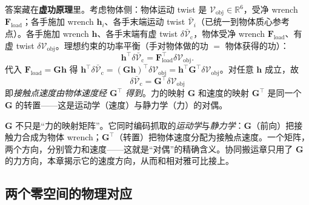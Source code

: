答案藏在\textbf{虚功原理}里。考虑物体侧：物体运动 twist 是 $\boldsymbol{\mathcal{V}}_{\text{obj}}\in\mathbb{R}^6$，受净 wrench $\mathbf{F}_{\text{load}}$；各手施加 wrench $\mathbf{h}_i$、各手末端运动 twist $\bar{\boldsymbol{\mathcal{V}}}_i$（已统一到物体质心参考点）。各手施加 wrench $\mathbf{h}$、各手末端有虚 twist $\delta\bar{\boldsymbol{\mathcal{V}}}_{\text{c}}$，物体受净 wrench $\mathbf{F}_{\text{load}}$、有虚 twist $\delta\boldsymbol{\mathcal{V}}_{\text{obj}}$。理想约束的功率平衡（手对物体做的功 $=$ 物体获得的功）：
\begin{equation}
  \mathbf{h}^\top\delta\bar{\boldsymbol{\mathcal{V}}}_{\text{c}}=\mathbf{F}_{\text{load}}^\top\delta\boldsymbol{\mathcal{V}}_{\text{obj}}.
  \label{eq:ma-vwork-balance}
\end{equation}
代入 $\mathbf{F}_{\text{load}}=\mathbf{G}\mathbf{h}$ 得 $\mathbf{h}^\top\delta\bar{\boldsymbol{\mathcal{V}}}_{\text{c}}=(\mathbf{G}\mathbf{h})^\top\delta\boldsymbol{\mathcal{V}}_{\text{obj}}=\mathbf{h}^\top\mathbf{G}^\top\delta\boldsymbol{\mathcal{V}}_{\text{obj}}$。对任意 $\mathbf{h}$ 成立，故
\begin{equation}
  \boxed{\;\delta\bar{\boldsymbol{\mathcal{V}}}_{\text{c}}=\mathbf{G}^\top\delta\boldsymbol{\mathcal{V}}_{\text{obj}}\;}
  \label{eq:ma-Gtransp}
\end{equation}
即\emph{接触点速度由物体速度经 $\mathbf{G}^\top$ 得到}。力的映射 $\mathbf{G}$ 和速度的映射 $\mathbf{G}^\top$ 是同一个 $\mathbf{G}$ 的转置——这是运动学（速度）与静力学（力）的对偶。

\begin{insight}
$\mathbf{G}$ 不只是“力的映射矩阵”。它同时编码抓取的\emph{运动学}与\emph{静力学}：$\mathbf{G}$（前向）把接触力合成为物体 wrench；$\mathbf{G}^\top$（转置）把物体速度分配为接触点速度。一个矩阵，两个方向，分别管力和速度——这就是“对偶”的精确含义。协同搬运章只用了 $\mathbf{G}$ 的力方向，本章揭示它的速度方向，从而和相对雅可比接上。
\end{insight}

\subsection{两个零空间的物理对应}
\label{sec:ma-nullspaces}

